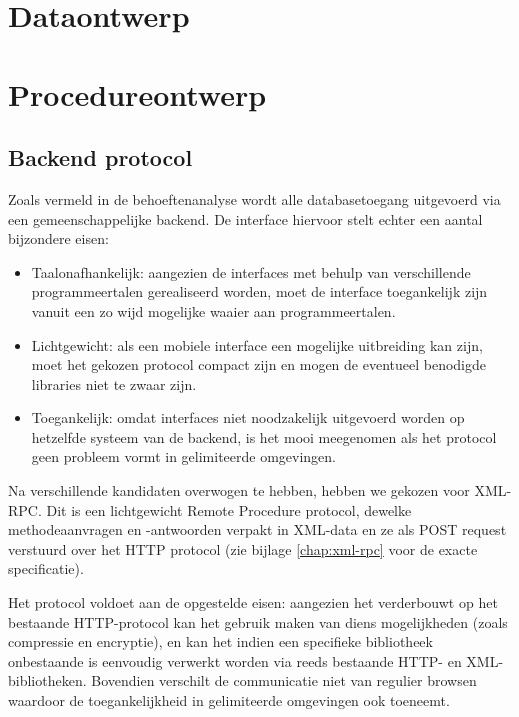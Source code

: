 \chapter{Dataontwerp}


\chapter{Procedureontwerp}

\section{Backend protocol}

Zoals vermeld in de behoeftenanalyse wordt alle databasetoegang uitgevoerd via een gemeenschappelijke backend. De interface hiervoor stelt echter een aantal bijzondere eisen:
\begin{itemize}
\item{Taalonafhankelijk: aangezien de interfaces met behulp van verschillende programmeertalen gerealiseerd worden, moet de interface toegankelijk zijn vanuit een zo wijd mogelijke waaier aan programmeertalen.}
\item{Lichtgewicht: als een mobiele interface een mogelijke uitbreiding kan zijn, moet het gekozen protocol compact zijn en mogen de eventueel benodigde libraries niet te zwaar zijn.}
\item{Toegankelijk: omdat interfaces niet noodzakelijk uitgevoerd worden op hetzelfde systeem van de backend, is het mooi meegenomen als het protocol geen probleem vormt in gelimiteerde omgevingen.}
\end{itemize}

Na verschillende kandidaten overwogen te hebben, hebben we gekozen voor XML-RPC. Dit is een lichtgewicht Remote Procedure protocol, dewelke methodeaanvragen en -antwoorden verpakt in XML-data en ze als POST request verstuurd over het HTTP protocol (zie bijlage \ref{chap:xml-rpc} voor de exacte specificatie).

Het protocol voldoet aan de opgestelde eisen: aangezien het verderbouwt op het bestaande HTTP-protocol kan het gebruik maken van diens mogelijkheden (zoals compressie en encryptie), en kan het indien een specifieke bibliotheek onbestaande is eenvoudig verwerkt worden via reeds bestaande HTTP- en XML-bibliotheken. Bovendien verschilt de communicatie niet van regulier browsen waardoor de toegankelijkheid in gelimiteerde omgevingen ook toeneemt.

